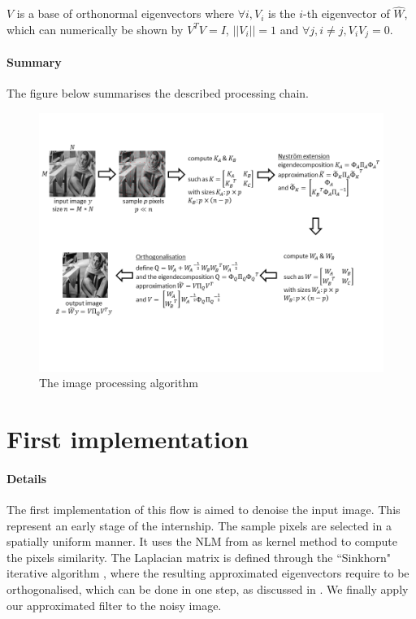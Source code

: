 \(V\) is a base of orthonormal eigenvectors where \(\forall i, V_i\) is the \(i\)-th eigenvector of \(\hat{W}\), which can numerically be shown by \(V^T V = I\), \(||V_i|| = 1\) and \(\forall j, i \neq j, V_i V_j = 0\).

\paragraph{Summary}

The figure below summarises the described processing chain.

\begin{figure}[H]
    \centering
    \includegraphics[width=1.2\textwidth]{img/processingChain.png}
    \caption{The image processing algorithm}
\end{figure}

\section{First implementation}

\paragraph{Details}
The first implementation of this flow is aimed to denoise the input image.
This represent an early stage of the internship.
The sample pixels are selected in a spatially uniform manner.
It uses the NLM from \cite{buades_review_2005} as kernel method to compute the pixels similarity.
The Laplacian matrix is defined through the ``Sinkhorn" iterative algorithm \cite{milanfar_symmetrizing_2013}, where the resulting approximated eigenvectors require to be orthogonalised, which can be done in one step, as discussed in \cite{fowlkes_spectral_2004}.
We finally apply our approximated filter to the noisy image.

